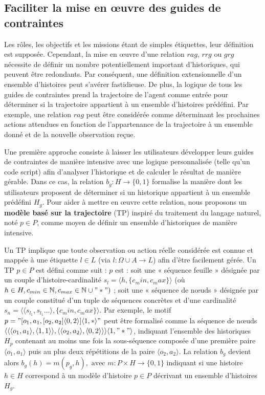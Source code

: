 \subsection{Faciliter la mise en œuvre des guides de contraintes}

Les rôles, les objectifs et les missions étant de simples étiquettes, leur définition est supposée. Cependant, la mise en œuvre d'une relation $rag$, $rrg$ ou $grg$ nécessite de définir un nombre potentiellement important d'historiques, qui peuvent être redondants. Par conséquent, une définition extensionnelle d'un ensemble d'histoires peut s'avérer fastidieuse. De plus, la logique de tous les guides de contraintes prend la trajectoire de l'agent comme entrée pour déterminer si la trajectoire appartient à un ensemble d'histoires prédéfini. Par exemple, une relation $rag$ peut être considérée comme déterminant les prochaines actions attendues en fonction de l'appartenance de la trajectoire à un ensemble donné et de la nouvelle observation reçue.

Une première approche consiste à laisser les utilisateurs développer leurs guides de contraintes de manière intensive avec une logique personnalisée (telle qu'un code script) afin d'analyser l'historique et de calculer le résultat de manière gérable. Dans ce cas, la relation $b_g: H \to \{0,1\}$ formalise la manière dont les utilisateurs proposent de déterminer si un historique appartient à un ensemble prédéfini $H_g$.
Pour aider à mettre en œuvre cette relation, nous proposons un \textbf{modèle basé sur la trajectoire} (TP) inspiré du traitement du langage naturel, noté $p \in P$, comme moyen de définir un ensemble d'historiques de manière intensive.

Un TP implique que toute observation ou action réelle considérée est connue et mappée à une étiquette $l \in L$ (via $l: \Omega \cup A \to L$) afin d'être facilement gérée. Un TP $p \in P$ est défini comme suit : $p$ est : soit une « séquence feuille » désignée par un couple d'histoire-cardinalité $s_l = \langle h, \{c_min,c_max\}\rangle$ (où $h \in H, c_{min} \in \mathbb{N}, c_{max} \in \mathbb{N} \cup "*")$ ; soit une « séquence de nœuds » désignée par un couple constitué d'un tuple de séquences concrètes et d'une cardinalité $s_n = \langle \langle s_{l_1}, s_{l_1}\dots \rangle, \{c_min,c_max\}\rangle$. Par exemple, le motif $p = \allowbreak "[o_1,a_1,[o_2,a_2]\langle0,2\rangle]\langle1,*\rangle"$ peut être formalisé comme la séquence de nœuds $\allowbreak \langle \langle \langle o_1,a_1\rangle,\langle 1,1 \rangle \rangle, \langle \langle o_2,a_2 \rangle, \langle 0,2 \rangle \rangle \rangle \langle 1,"*" \rangle$, indiquant l'ensemble des historiques $H_p$ contenant au moins une fois la sous-séquence composée d'une première paire $\langle o_1,a_1\rangle$ puis au plus deux répétitions de la paire $\langle o_2,a_2 \rangle$.
La relation $b_g$ devient alors $b_g(h) = m(p_g,h), \text{ avec } m: P \times H \to \{0,1\}$ indiquant si une histoire $h \in H$ correspond à un modèle d'histoire $p \in P$ décrivant un ensemble d'histoires $H_g$.

